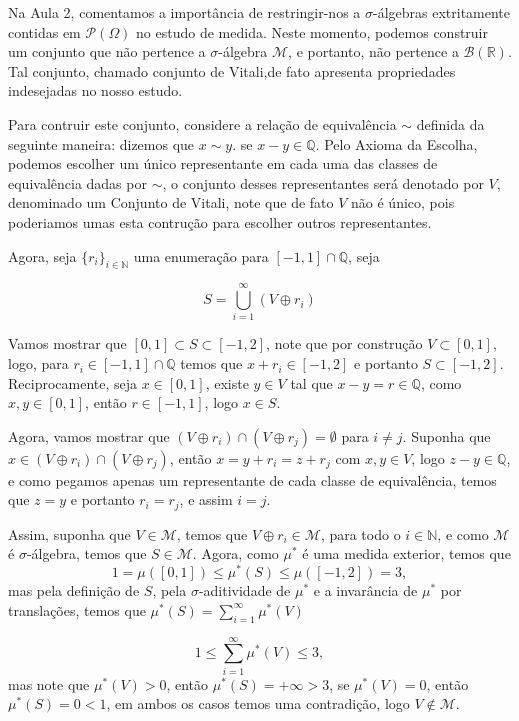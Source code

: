 \begin{exemplo}

    Na Aula 2, comentamos a importância de restringir-nos a $\sigma$-álgebras 
    extritamente contidas em $\mathcal{P}(\Omega)$ no estudo de medida.
    Neste momento, podemos construir um conjunto que não pertence a $\sigma$-álgebra
    $\mathcal{M}$, e portanto, não pertence a $\mathcal{B}(\mathbb{R})$. Tal conjunto,
    chamado conjunto de Vitali,de fato apresenta propriedades indesejadas no nosso 
    estudo.
    
    Para contruir este conjunto, considere a relação de equivalência $\sim$ definida da
    seguinte maneira: dizemos que $x \sim y$. se $x-y \in \mathbb{Q}$. Pelo Axioma da 
    Escolha, podemos escolher um único representante em cada uma das classes de 
    equivalência dadas por $\sim$, o conjunto desses representantes será denotado por 
    $V$, denominado um Conjunto de Vitali, note que de fato $V$ não é único, pois 
    poderiamos umas esta contrução para escolher outros representantes.
    
    Agora, seja $\{r_i\}_{i \in \mathbb{N}}$ uma enumeração para 
    $[-1,1]\cap\mathbb{Q}$, seja
    
    \[
        S = \bigcup_{i=1}^{\infty} (V \oplus r_i)
    \]
    
    Vamos mostrar que $[0,1] \subset S \subset [-1,2]$, note que por construção 
    $V \subset [0,1]$, logo, para $r_i\in [-1,1]\cap \mathbb{Q}$ temos que
    $x + r_i \in [-1,2]$ e portanto $S \subset [-1,2]$. 
    Reciprocamente, seja $x \in [0,1]$, existe $y \in V$ tal que 
    $x-y = r \in \mathbb{Q}$, como $x,y \in [0,1]$, então $r \in [-1,1]$, 
    logo $x \in S$.
    
    Agora, vamos mostrar que $(V \oplus r_i )\cap (V \oplus r_j )= \emptyset$ 
    para $i\neq j$. Suponha que $x \in (V \oplus r_i )\cap (V \oplus r_j)$, então
    $x = y + r_i = z + r_j$ com $x,y \in V$, logo $z-y \in \mathbb{Q}$, e como pegamos
    apenas um representante de cada classe de equivalência, temos que $z=y$ e portanto
    $r_i = r_j$, e assim $i=j$.
    
    Assim, suponha que $V \in \mathcal{M}$, temos que $V\oplus r_i \in \mathcal{M}$, 
    para todo o $i \in \mathbb{N}$, e como $\mathcal{M}$  é $\sigma$-álgebra, temos
    que $S \in \mathcal{M}$. Agora, como $\mu^*$ é uma medida exterior, temos 
    que 
    \[
        1=\mu([0,1]) \le \mu^*(S) \le \mu([-1,2])=3,
    \]
    mas pela definição de $S$, pela $\sigma$-aditividade de $\mu^*$ e a invarância
    de $\mu^*$ por translações, temos que $\mu^*(S) = \sum_{i=1}^{\infty} \mu^*(V)$ 
    
    \[
         1 \le \sum_{i=1}^{\infty} \mu^*(V) \le3,
    \]
    mas note que $\mu^*(V)>0$, então $\mu^*(S) =+\infty > 3$, se $\mu^*(V) = 0$, então
    $\mu^*(S)=0 <1$, em ambos os casos temos uma contradição, logo 
    $V \not \in \mathcal{M}$.
\end{exemplo}
